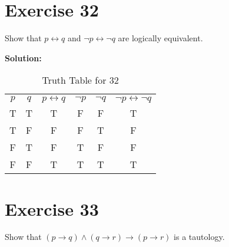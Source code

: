 \documentclass{Axon}
\begin{document}
\section*{Exercise 32}
Show that \(p \leftrightarrow q\) and \(\lnot p \leftrightarrow \lnot q\) are logically equivalent.

\noindent
\textbf{Solution:}
\begin{table}[ht]
    \centering
    \begin{tabular}{c|c|c|c|c|c}
        \(p\) & \(q\) & \(p \leftrightarrow q\) & \(\lnot p\) & \(\lnot q\) & \(\lnot p \leftrightarrow \lnot q\) \\
        T     & T     & T                       & F           & F           & T                                   \\
        T     & F     & F                       & F           & T           & F                                   \\
        F     & T     & F                       & T           & F           & F                                   \\
        F     & F     & T                       & T           & T           & T
    \end{tabular}
    \caption{Truth Table for 32}
\end{table}

\section*{Exercise 33}
Show that \((p \to q) \land (q \to r) \to (p  \to r)\) is a tautology.
\end{document}
